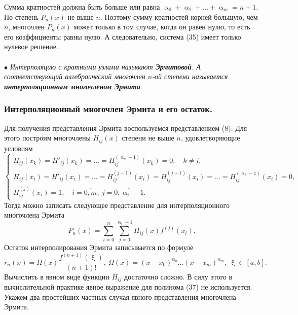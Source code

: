 \documentclass[a4paper, 12pt]{report}
\numberwithin{equation}{section}
\renewcommand{\alpha}{\upalpha}
\renewcommand{\xi}{\upxi}
\begin{document}
	 Сумма кратностей должна быть больше или равна $\alpha_0 + \alpha_1 + \ldots + \alpha_m = n+1.$ Но степень $P_n(x)$ не выше $n$. Поэтому сумму кратностей корней большую, чем $n$, многочлен $P_n(x)$ может только в том случае, когда он равен нулю, то есть его коэффициенты равны нулю.
	 А следовательно, система (35) имеет только нулевое решение.\\\\
	 $\bullet$ \textit{Интерполяцию с кратными узлами называют \textbf{Эрмитовой}. А соответствующий алгебраический многочлен $n$-ой степени называется \textbf{интерполяционным многочленом Эрмита}}. 
	 \subsubsection{Интерполяционный многочлен Эрмита и его остаток.}
	 Для получения представления Эрмита воспользуемся представлением (8). Для этого построим многочлены $H_{ij}(x)$ степени не выше $n$, удовлетворяющие условиям 
	 \begin{equation}
	 	\begin{cases}
			 H_{ij}(x_k) = H'_{ij}(x_k) = \ldots = H_{ij}^{(\alpha_k-1)}(x_k) = 0,\quad k \ne i,\\
			 H_{ij}(x_i) = H'_{ij}(x_i) = \ldots = H_{ij}^{(j-1)}(x_i) = H_{ij}^{(j+1)}(x_i) = \ldots = H_{ij}^{(\alpha_i - 1)}(x_i) = 0,\\
			 H_{ij}^{(j)}(x_i) = 1,\quad i=\overline{0,m},\ j = \overline{0,\alpha_i-1}.
		\end{cases}
	 \end{equation}
	 Тогда можно записать следующее представление для интерполяционного многочлена Эрмита 
	 \begin{equation}
	 	P_n(x) = \sum_{i=0}^n \sum_{j=0}^{\alpha_i-1}H_{ij}(x) f^{(j)}(x_i).
	 \end{equation}
	 Остаток интерполирования Эрмита записывается по формуле \begin{equation}
	 	r_n(x) = \Omega(x) \dfrac{f^{(n+1)}(\xi)}{(n+1)!},\ \Omega (x) = (x-x_0)^{\alpha_0}\ldots (x-x_m)^{\alpha_m},\ \xi \in [a,b].
	 \end{equation}
	 Вычислить в явном виде функции $H_{ij}$ достаточно сложно. В силу этого в вычислительной практике явное выражение для полинома (37) не используется. Укажем два простейших частных случая явного представления многочлена Эрмита.
\end{document}
